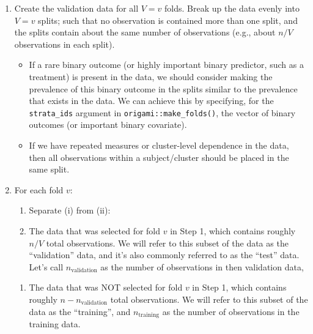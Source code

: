 \documentclass[12pt, krantz2,]{book}
\providecommand{\tightlist}{%
  \setlength{\itemsep}{0pt}\setlength{\parskip}{0pt}}
\theoremstyle{definition}
\theoremstyle{definition}
\theoremstyle{definition}
\newcommand{\1}{\mathbbm{1}}
\begin{document}
\begin{enumerate}
\def\labelenumi{\arabic{enumi}.}
\item
  Create the validation data for all \(V=v\) folds. Break up the data evenly
  into \(V=v\) splits; such that no observation is contained more than one split,
  and the splits contain about the same number of observations (e.g., about
  \(n/V\) observations in each split).

  \begin{itemize}
  \tightlist
  \item
    If a rare binary outcome (or highly important binary predictor, such as
    a treatment) is present in the data, we should consider making the
    prevalence of this binary outcome in the splits similar to the
    prevalence that exists in the data. We can achieve this by specifying,
    for the \texttt{strata\_ids} argument in \texttt{origami::make\_folds()}, the vector of
    binary outcomes (or important binary covariate).
  \item
    If we have repeated measures or cluster-level dependence in the data,
    then all observations within a subject/cluster should be placed in the
    same split.
  \end{itemize}
\item
  For each fold \(v\):

  \begin{enumerate}
  \def\labelenumii{\alph{enumii}.}
  \item
    Separate (i) from (ii):
  \item
    The data that was selected for fold \(v\) in Step 1, which contains
    roughly \(n/V\) total observations. We will refer to this subset of the
    data as the ``validation'' data, and it's also commonly referred to as
    the ``test'' data. Let's call \(n_{\text{validation}}\) as the number of
    observations in then validation data,
  \end{enumerate}

  \begin{enumerate}
  \def\labelenumii{\roman{enumii}.}
  \setcounter{enumii}{1}
  \tightlist
  \item
    The data that was NOT selected for fold \(v\) in Step 1, which contains
    roughly \(n - n_{\text{validation}}\) total observations. We will refer
    to this subset of the data as the ``training'', and
    \(n_{\text{training}}\) as the number of observations in the training
    data.
  \end{enumerate}


\end{enumerate}
\end{document}
